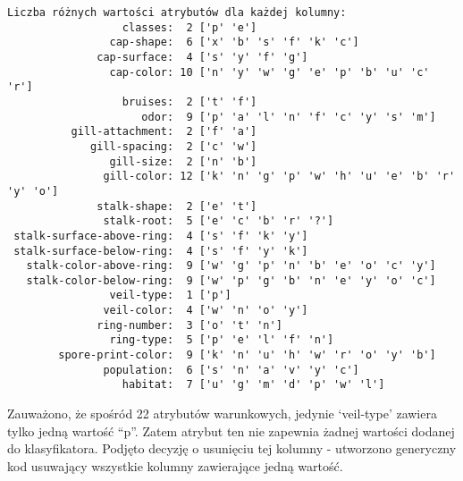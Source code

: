 \documentclass[11pt]{article}
\begin{document}
    \begin{Verbatim}[commandchars=\\\{\}]
Liczba różnych wartości atrybutów dla każdej kolumny:
                  classes:  2 ['p' 'e']
                cap-shape:  6 ['x' 'b' 's' 'f' 'k' 'c']
              cap-surface:  4 ['s' 'y' 'f' 'g']
                cap-color: 10 ['n' 'y' 'w' 'g' 'e' 'p' 'b' 'u' 'c' 'r']
                  bruises:  2 ['t' 'f']
                     odor:  9 ['p' 'a' 'l' 'n' 'f' 'c' 'y' 's' 'm']
          gill-attachment:  2 ['f' 'a']
             gill-spacing:  2 ['c' 'w']
                gill-size:  2 ['n' 'b']
               gill-color: 12 ['k' 'n' 'g' 'p' 'w' 'h' 'u' 'e' 'b' 'r' 'y' 'o']
              stalk-shape:  2 ['e' 't']
               stalk-root:  5 ['e' 'c' 'b' 'r' '?']
 stalk-surface-above-ring:  4 ['s' 'f' 'k' 'y']
 stalk-surface-below-ring:  4 ['s' 'f' 'y' 'k']
   stalk-color-above-ring:  9 ['w' 'g' 'p' 'n' 'b' 'e' 'o' 'c' 'y']
   stalk-color-below-ring:  9 ['w' 'p' 'g' 'b' 'n' 'e' 'y' 'o' 'c']
                veil-type:  1 ['p']
               veil-color:  4 ['w' 'n' 'o' 'y']
              ring-number:  3 ['o' 't' 'n']
                ring-type:  5 ['p' 'e' 'l' 'f' 'n']
        spore-print-color:  9 ['k' 'n' 'u' 'h' 'w' 'r' 'o' 'y' 'b']
               population:  6 ['s' 'n' 'a' 'v' 'y' 'c']
                  habitat:  7 ['u' 'g' 'm' 'd' 'p' 'w' 'l']

    \end{Verbatim}

    Zauważono, że spośród 22 atrybutów warunkowych, jedynie `veil-type'
zawiera tylko jedną wartość ``p''. Zatem atrybut ten nie zapewnia żadnej
wartości dodanej do klasyfikatora. Podjęto decyzję o usunięciu tej
kolumny - utworzono generyczny kod usuwający wszystkie kolumny
zawierające jedną wartość.
\end{document}
